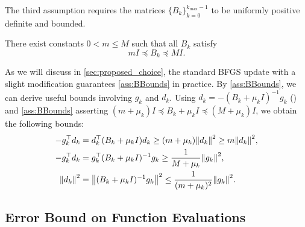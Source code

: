 \documentclass[journal]{subfiles}
\begin{document}
The third assumption requires the matrices $\{B_k\}_{k=0}^{k_{\mathrm{max}}-1}$ to be uniformly positive definite and bounded.
\begin{assumption}\label{ass:BBounds}
    There exist constants $0 < m \leq M$ such that all $B_k$ satisfy
    \begin{equation*}\label{eq:BBounds}
        mI \preceq B_k \preceq MI.
    \end{equation*}
\end{assumption}
As we will discuss in \cref{sec:proposed_choice}, the standard BFGS update with a slight modification guarantees \cref{ass:BBounds} in practice.
By \cref{ass:BBounds}, we can derive useful bounds involving $g_k$ and $d_k$.
Using $d_k=-(B_k+\mu_k I)^{-1} g_k$ () and \cref{ass:BBounds} asserting $(m + \mu_k)I \preceq B_k + \mu_k I \preceq (M + \mu_k)I$, we obtain the following bounds:
\begin{align}
    -g_k^\top d_k & = d_k^\top (B_k+\mu_k I) d_k      \ge (m+\mu_k)\norm{d_k}^2 \ge m \norm{d_k}^2, \label{eq:BBounds_results_zero} \\
    -g_k^\top d_k & = g_k^\top (B_k+\mu_k I)^{-1} g_k \ge \frac{1}{M+\mu_k}\norm{g_k}^2, \label{eq:BBounds_results_first}           \\
    \norm{d_k}^2  & = \norm{(B_k+\mu_k I)^{-1}g_k}^2 \le \frac{1}{(m+\mu_k)^2}\norm{g_k}^2. \label{eq:BBounds_results_second}
\end{align}

\subsection{Error Bound on Function Evaluations}\label{sec:error_bound_on_function_evaluations}
\end{document}
